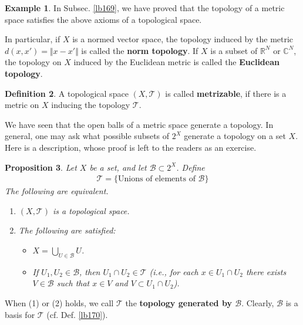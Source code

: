 \documentclass[12pt,b5paper,notitlepage]{article}
\theoremstyle{definition}
\newtheorem{df}{Definition}[section]
\newtheorem{eg}[df]{Example}
\theoremstyle{plain}
\newtheorem{pp}[df]{Proposition}
\newcommand{\mc}{\mathcal}
\newcommand{\Cbb}{\mathbb C}
\newcommand{\Rbb}{\mathbb R}
\numberwithin{equation}{section}
\begin{document}
\begin{eg}\label{lb529}
In Subsec. \ref{lb169}, we have proved that the topology of a metric space satisfies the above axioms of a topological space. 

In particular,   if $X$ is a normed vector space, the topology induced by the metric $d(x,x')=\Vert x-x'\Vert$ is called the \textbf{norm topology}.  If $X$ is a subset of $\Rbb^N$ or $\Cbb^N$, the topology on $X$ induced by the Euclidean metric is called the \textbf{Euclidean topology}.   \hfill\qedsymbol
\end{eg}

\begin{df}
A topological space $(X,\mc T)$ is called \textbf{metrizable},  if there is a metric on $X$ inducing the topology $\mc T$. 
\end{df}


We have seen that the open balls of a metric space generate a topology. In general, one may ask what possible subsets of $2^X$ generate a topology on a set $X$. Here is a description, whose proof is left to the readers as an exercise.

\begin{pp}\label{lb171}
Let $X$ be a set, and let $\mc B\subset 2^X$. Define
\begin{align}
\mc T=\{\text{Unions of elements of }\mc B\}
\end{align}
The following are equivalent.
\begin{enumerate}[label=(\arabic*)]
\item $(X,\mc T)$ is a topological space.
\item The following are satisfied:
\begin{itemize}
\item[(2-a)] $X=\bigcup_{U\in\mc B}U$.
\item[(2-b)] If $U_1,U_2\in\mc B$, then $U_1\cap U_2\in\mc T$ (i.e., for each $x\in U_1\cap U_2$ there exists $V\in\mc B$ such that $x\in V$ and $V\subset U_1\cap U_2$).
\end{itemize} 
\end{enumerate}
\end{pp}

When (1) or (2) holds, we call $\mc T$ the \textbf{topology generated by $\mc B$}.  Clearly, $\mc B$ is a basis for $\mc T$ (cf. Def. \ref{lb170}).
\end{document}
